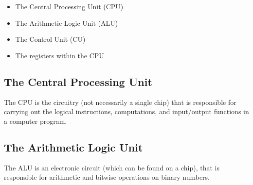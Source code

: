 \begin{itemize}
	\item The Central Processing Unit (CPU)
	\item The Arithmetic Logic Unit (ALU)
	\item The Control Unit (CU)
	\item The registers within the CPU
\end{itemize} 

\subsection*{The Central Processing Unit}
The CPU is the circuitry (not necessarily a single chip) that is responsible for carrying out the logical instructions, computations, and input/output functions in a computer program. 

\subsection*{The Arithmetic Logic Unit}
The ALU is an electronic circuit (which can be found on a chip), that is responsible for arithmetic and bitwise operations on binary numbers. 


